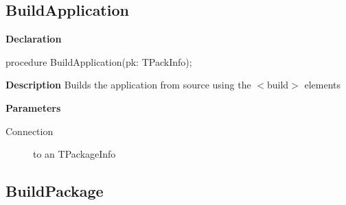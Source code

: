 \documentclass{report}
\newif\ifpdf
\begin{document}
\subsection*{BuildApplication}
\fi
\label{ipkbuild-BuildApplication}
\begin{list}{}{
\setlength{\itemindent}{0cm}
\setlength{\listparindent}{0cm}
\setlength{\leftmargin}{\evensidemargin}
\addtolength{\leftmargin}{\tmplength}
\settowidth{\labelsep}{X}
\addtolength{\leftmargin}{\labelsep}
\setlength{\labelwidth}{\tmplength}
}
\item[\textbf{Declaration}\hfill]
\ifpdf
\begin{flushleft}
\fi
\begin{ttfamily}
procedure BuildApplication(pk: TPackInfo);\end{ttfamily}

\ifpdf
\end{flushleft}
\fi

\par
\item[\textbf{Description}]
Builds the application from source using the {$<$}build{$>$} elements \par
\item[\textbf{Parameters}]
\begin{description}
\item[Connection] to an TPackageInfo
\end{description}


\end{list}
\ifpdf
\subsection*{\large{\textbf{BuildPackage}}\normalsize\hspace{1ex}\hrulefill}
\else
\end{document}
